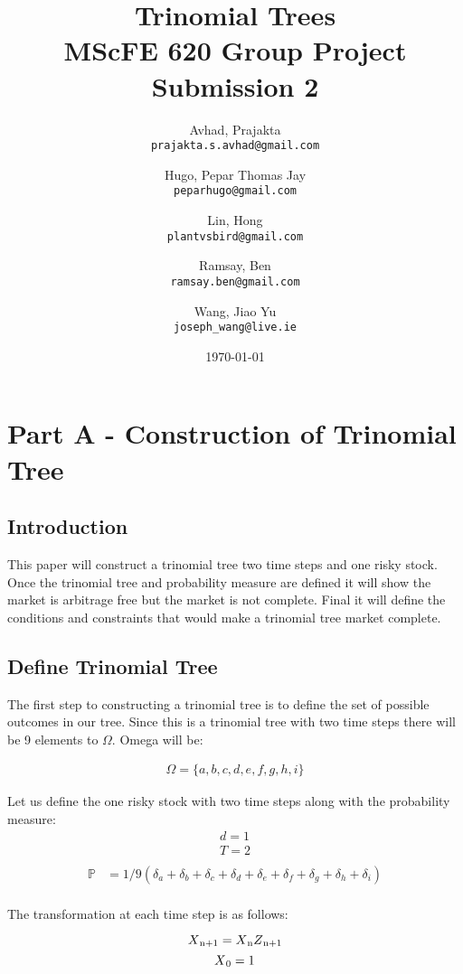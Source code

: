 \documentclass{article}
\title{Trinomial Trees \\ MScFE 620 Group Project Submission 2}
\date{\today}
\author{
  Avhad, Prajakta\\
  \texttt{prajakta.s.avhad@gmail.com}
  \and
  Hugo, Pepar Thomas Jay\\
  \texttt{peparhugo@gmail.com}
  \and
  Lin, Hong\\
  \texttt{plantvsbird@gmail.com}
  \and
  Ramsay, Ben\\
  \texttt{ramsay.ben@gmail.com}
  \and
  Wang, Jiao Yu\\
  \texttt{joseph\_wang@live.ie}
}
\begin{document}
\maketitle  


\section{Part A - Construction of Trinomial Tree}
\subsection{Introduction}

This paper will construct a trinomial tree two time steps and one risky stock. Once the trinomial tree and probability measure are defined it will show the market is arbitrage free but the market is not complete. Final it will define the conditions and constraints that would make a trinomial tree market complete.

\subsection{Define Trinomial Tree}

The first step to constructing a trinomial tree is to define the set of possible outcomes in our tree. Since this is a trinomial tree with two time steps there will be 9 elements to $\Omega$. Omega will be:

\begin{align*}
  \Omega = \{ a, b, c, d, e, f, g, h, i \}
\end{align*}


Let us define the one risky stock with two time steps along with the probability measure:
\begin{align*}
    d=1 \\
    T=2 \\
\end{align*}
\begin{align*}
    \mathbb{P} & = 1/9(\delta_a + \delta_b + \delta_c +\delta_d + \delta_e + \delta_f + \delta_g + \delta_h + \delta_i \label{eq:pstar}) \\
\end{align*}

The transformation at each time step is as follows:

\begin{equation}
 X\textsubscript{n+1}=X\textsubscript{n}Z\textsubscript{n+1} \label{eq:x_transformation}
\end{equation}
\begin{equation}
 X\textsubscript{0}=1
\end{equation}
\end{document}

